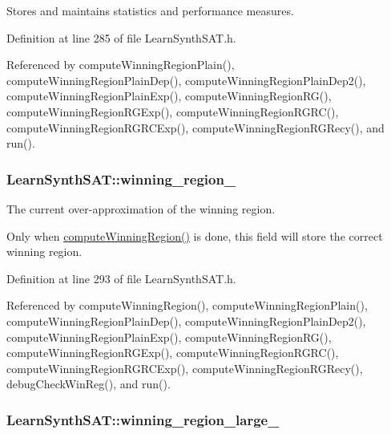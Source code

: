 Stores and maintains statistics and performance measures. 



Definition at line 285 of file Learn\-Synth\-S\-A\-T.\-h.



Referenced by compute\-Winning\-Region\-Plain(), compute\-Winning\-Region\-Plain\-Dep(), compute\-Winning\-Region\-Plain\-Dep2(), compute\-Winning\-Region\-Plain\-Exp(), compute\-Winning\-Region\-R\-G(), compute\-Winning\-Region\-R\-G\-Exp(), compute\-Winning\-Region\-R\-G\-R\-C(), compute\-Winning\-Region\-R\-G\-R\-C\-Exp(), compute\-Winning\-Region\-R\-G\-Recy(), and run().

\hypertarget{classLearnSynthSAT_aced2bce789c7a93ed4b5391dd0690616}{
\subsubsection[{winning\-\_\-region\-\_\-}]{ Learn\-Synth\-S\-A\-T\-::winning\-\_\-region\-\_\-\hspace{0.3cm}{\ttfamily [protected]}}}\label{classLearnSynthSAT_aced2bce789c7a93ed4b5391dd0690616}


The current over-\/approximation of the winning region. 

Only when \hyperlink{classLearnSynthSAT_a055b4699184d09bb7f6b15052ac684db}{compute\-Winning\-Region()} is done, this field will store the correct winning region. 

Definition at line 293 of file Learn\-Synth\-S\-A\-T.\-h.



Referenced by compute\-Winning\-Region(), compute\-Winning\-Region\-Plain(), compute\-Winning\-Region\-Plain\-Dep(), compute\-Winning\-Region\-Plain\-Dep2(), compute\-Winning\-Region\-Plain\-Exp(), compute\-Winning\-Region\-R\-G(), compute\-Winning\-Region\-R\-G\-Exp(), compute\-Winning\-Region\-R\-G\-R\-C(), compute\-Winning\-Region\-R\-G\-R\-C\-Exp(), compute\-Winning\-Region\-R\-G\-Recy(), debug\-Check\-Win\-Reg(), and run().

\hypertarget{classLearnSynthSAT_aaa79e8772e9ce8e59dc14e3bb1784256}{
\subsubsection[{winning\-\_\-region\-\_\-large\-\_\-}]{ Learn\-Synth\-S\-A\-T\-::winning\-\_\-region\-\_\-large\-\_\-\hspace{0.3cm}{\ttfamily [protected]}}}\label{classLearnSynthSAT_aaa79e8772e9ce8e59dc14e3bb1784256}


